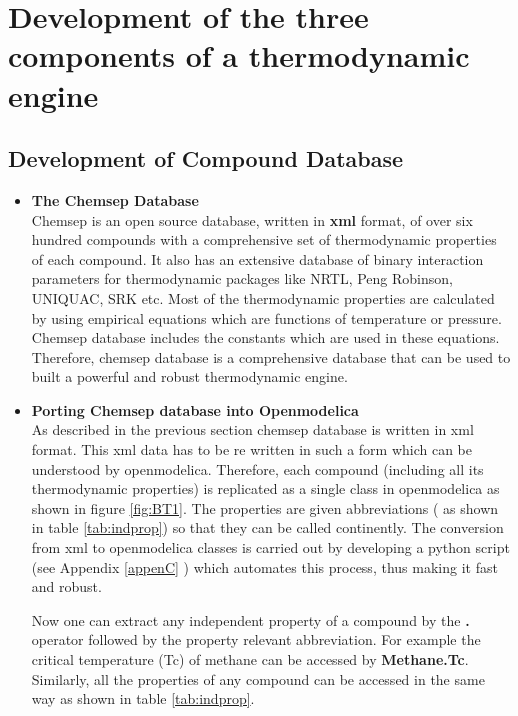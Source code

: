 \documentclass[12pt]{report}
\begin{document}
\section{Development of the three components of a thermodynamic engine}
\subsection{Development of Compound Database}
\begin{itemize}
\item {\textbf{The Chemsep Database}} \\
Chemsep is an open source database, written in \textbf{xml} format, of over six hundred compounds with a comprehensive set of thermodynamic properties of each compound. It also has an extensive database of binary interaction parameters for thermodynamic packages like NRTL, Peng Robinson, UNIQUAC, SRK etc. Most of the thermodynamic properties are calculated by using empirical equations which are functions of temperature or pressure. Chemsep database includes the constants which are used in these equations. Therefore, chemsep database is a comprehensive database that can be used to built a powerful and robust thermodynamic engine.

\item{\textbf{Porting Chemsep database into Openmodelica}} \\
As described in the previous section chemsep database is written in xml format. This xml data has to be re written in such a form which can be understood by openmodelica. Therefore, each compound (including all its thermodynamic properties) is replicated as a single class in openmodelica as shown in figure \ref{fig:BT1}. The properties are given abbreviations ( as shown in table \ref{tab:indprop}) so that they can be called continently. The conversion from xml to openmodelica classes is carried out by developing a python script (see Appendix \ref{appenC} ) which automates this process, thus making it fast and robust. 

Now one can extract any independent property of a compound by the \textbf{.} operator followed by the property relevant abbreviation. For example the critical temperature (Tc) of methane can be accessed by \textbf{Methane.Tc}. Similarly, all the properties of any compound can be accessed in the same way as shown in table \ref{tab:indprop}. \\
\end{itemize}
\end{document}
